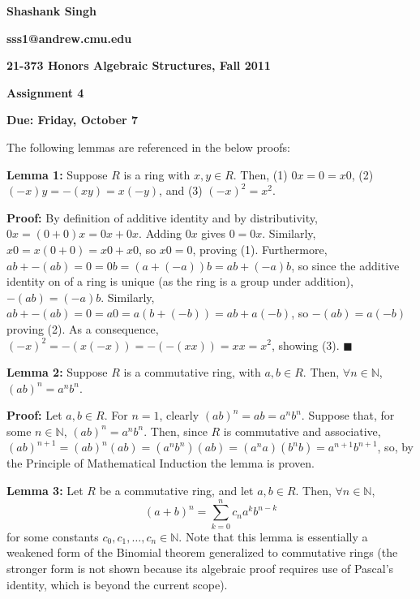 \documentclass{article}%
\begin{document}
\begin{center}
\textbf{Shashank Singh}

\textbf{sss1@andrew.cmu.edu}

\textbf{21-373 \quad Honors Algebraic Structures, Fall 2011}

\textbf{Assignment 4}

\textbf{Due: Friday, October 7}\\
\end{center}

The following lemmas are referenced in the below proofs:

\textbf{Lemma 1:} Suppose $R$ is a ring with $x, y \in R$. Then,
(1) $0x = 0 = x0$, (2) $(-x)y = -(xy) = x(-y)$, and (3) $(-x)^2 = x^2$.

\textbf{Proof:} By definition of additive identity and by distributivity,
$0x = (0 + 0)x = 0x + 0x$. Adding $0x$ gives $0 = 0x$. Similarly,
$x0 = x(0 + 0) = x0 + x0$, so $x0 = 0$, proving (1). Furthermore,
$ab + -(ab) = 0 = 0b = (a + (-a))b = ab + (-a)b$, so since the additive
identity on of a ring is unique (as the ring is a group under addition),
$-(ab) = (-a)b$. Similarly, $ab + -(ab) = 0 = a0 = a(b + (-b)) = ab + a(-b)$,
so $-(ab) = a(-b)$ proving (2). As a consequence, $(-x)^2 = -(x(-x)) =
-(-(xx)) = xx = x^2$, showing (3). \qquad $\blacksquare$

\textbf{Lemma 2:} Suppose $R$ is a commutative ring, with $a,b \in R$. Then,
$\forall n \in \mathbb{N}$, $(ab)^n = a^nb^n$.

\textbf{Proof:} Let $a,b \in R$. For $n = 1$, clearly $(ab)^n = ab = a^nb^n$.
Suppose that, for some $n \in \mathbb{N}$, $(ab)^n = a^nb^n$. Then, since $R$
is commutative and associative, $(ab)^{n + 1} = (ab)^n(ab) = (a^nb^n)(ab)
 = (a^na)(b^nb) = a^{n + 1}b^{n + 1}$, so, by the Principle of Mathematical
Induction the lemma is proven.

\textbf{Lemma 3:} Let $R$ be a commutative ring, and let $a, b \in R$. Then,
$\forall n \in \mathbb{N}$, \[(a + b)^n = \sum_{k = 0}^n c_n a^kb^{n - k}\]
for some constants $c_0,c_1,\ldots,c_n \in \mathbb{N}$. Note that this lemma
is essentially a weakened form of the Binomial theorem generalized to
commutative rings (the stronger form is not shown because its algebraic
proof requires use of Pascal's identity, which is beyond the current scope).
\end{document}

